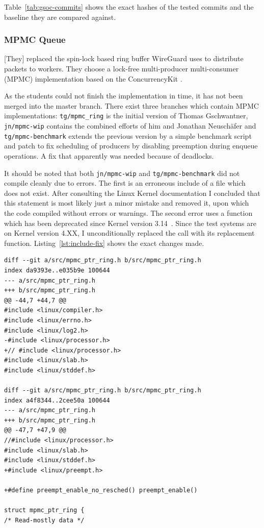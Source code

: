 \documentclass[IN,11pt,twoside,openright,master,english]{tumthesis}
\begin{document}
	Table~\ref{tab:gsoc-commits} shows the exact hashes of the tested commits and the baseline they are compared against.
	
	\subsubsection{MPMC Queue}
	[They] replaced the spin-lock based ring buffer WireGuard uses to distribute packets to workers. They choose a lock-free multi-producer multi-consumer (MPMC) implementation based on the ConcurrencyKit \cite{todo}. 
	
	As the students could not finish the implementation in time, it has not been merged into the master branch. There exist three branches which contain MPMC implementations: \texttt{tg/mpmc\_ring} is the initial version of Thomas Gschwantner, \texttt{jn/mpmc-wip} contains the combined efforts of him and Jonathan Neuschäfer and \texttt{tg/mpmc-benchmark} extends the previous version by a simple benchmark script and patch to fix scheduling of producers by disabling preemption during enqueue operations. A fix that apparently was needed because of deadlocks.
	
	It should be noted that both \texttt{jn/mpmc-wip} and \texttt{tg/mpmc-benchmark} did not compile cleanly due to errors.
	The first is an erroneous include of a file which does not exist. After consulting the Linux Kernel documentation I concluded that this statement is most likely just a minor mistake and removed it, upon which the code compiled without errors or warnings.
	The second error uses a function which has been deprecated since Kernel version 3.14~\cite{bibid}. Since the test systems are on Kernel version 4.XX, I unconditionally replaced the call with its replacement function.
	Listing~\ref{lst:include-fix} shows the exact changes made.
	
	\begin{lstlisting}[caption={Patches to compile MPMC commits},captionpos=b,label={lst:include-fix}]
diff --git a/src/mpmc_ptr_ring.h b/src/mpmc_ptr_ring.h
index da9393e..e035b9e 100644
--- a/src/mpmc_ptr_ring.h
+++ b/src/mpmc_ptr_ring.h
@@ -44,7 +44,7 @@
#include <linux/compiler.h>
#include <linux/errno.h>
#include <linux/log2.h>
-#include <linux/processor.h>
+// #include <linux/processor.h>
#include <linux/slab.h>
#include <linux/stddef.h>

diff --git a/src/mpmc_ptr_ring.h b/src/mpmc_ptr_ring.h
index a4f8344..2cee50a 100644
--- a/src/mpmc_ptr_ring.h
+++ b/src/mpmc_ptr_ring.h
@@ -47,7 +47,9 @@
//#include <linux/processor.h>
#include <linux/slab.h>
#include <linux/stddef.h>
+#include <linux/preempt.h>

+#define preempt_enable_no_resched() preempt_enable()

struct mpmc_ptr_ring {
/* Read-mostly data */
	\end{lstlisting}
	
\end{document}
